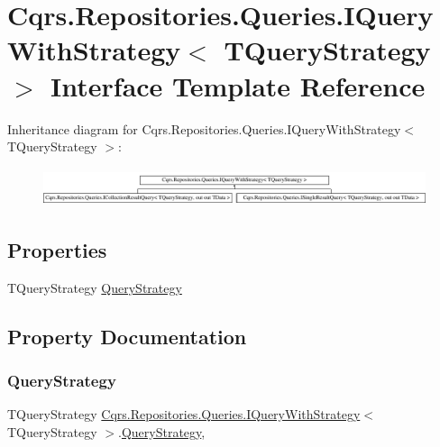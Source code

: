 \hypertarget{interfaceCqrs_1_1Repositories_1_1Queries_1_1IQueryWithStrategy}{}\section{Cqrs.\+Repositories.\+Queries.\+I\+Query\+With\+Strategy$<$ T\+Query\+Strategy $>$ Interface Template Reference}
\label{interfaceCqrs_1_1Repositories_1_1Queries_1_1IQueryWithStrategy}
Inheritance diagram for Cqrs.\+Repositories.\+Queries.\+I\+Query\+With\+Strategy$<$ T\+Query\+Strategy $>$\+:\begin{figure}[H]
\begin{center}
\leavevmode
\includegraphics[height=1.117764cm]{interfaceCqrs_1_1Repositories_1_1Queries_1_1IQueryWithStrategy}
\end{center}
\end{figure}
\subsection*{Properties}
\begin{DoxyCompactItemize}
\item 
T\+Query\+Strategy \hyperlink{interfaceCqrs_1_1Repositories_1_1Queries_1_1IQueryWithStrategy_a48ee82d7f6ff31e0ce25c09184982e34}{Query\+Strategy}
\end{DoxyCompactItemize}


\subsection{Property Documentation}
\mbox{\label{interfaceCqrs_1_1Repositories_1_1Queries_1_1IQueryWithStrategy_a48ee82d7f6ff31e0ce25c09184982e34}} 
\subsubsection{\texorpdfstring{Query\+Strategy}{QueryStrategy}}
{\footnotesize\ttfamily T\+Query\+Strategy \hyperlink{interfaceCqrs_1_1Repositories_1_1Queries_1_1IQueryWithStrategy}{Cqrs.\+Repositories.\+Queries.\+I\+Query\+With\+Strategy}$<$ T\+Query\+Strategy $>$.\hyperlink{classCqrs_1_1Repositories_1_1Queries_1_1QueryStrategy}{Query\+Strategy}\hspace{0.3cm}{\ttfamily [get]}, {\ttfamily [set]}}

